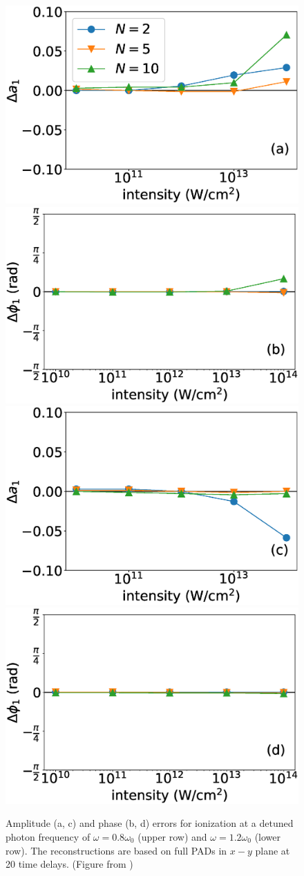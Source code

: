 \begin{figure}[!ht]
\centering
\includegraphics[width=0.49\linewidth]{figs/Photo_ionization/superpositions/Venzke_new_fig_6a.eps}
\includegraphics[width=0.49\linewidth]{figs/Photo_ionization/superpositions/Venzke_new_fig_6b.eps}
\includegraphics[width=0.49\linewidth]{figs/Photo_ionization/superpositions/Venzke_new_fig_6c.eps}
\includegraphics[width=0.49\linewidth]{figs/Photo_ionization/superpositions/Venzke_new_fig_6d.eps} 
\caption{
Amplitude (a, c) and phase (b, d) errors for ionization at a detuned photon frequency of $\omega=0.8\omega_0$ (upper row) and $\omega=1.2\omega_0$ (lower row). The reconstructions are based on full PADs in $x-y$ plane at 20 time delays. (Figure from \cite{venzke2021_wave})
} 
  \label{fig:detuned}
\end{figure}

